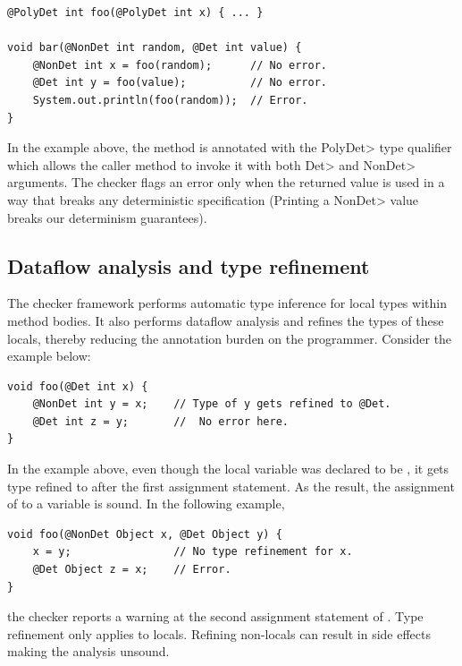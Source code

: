 \begin{verbatim}
@PolyDet int foo(@PolyDet int x) { ... }

void bar(@NonDet int random, @Det int value) {
    @NonDet int x = foo(random);      // No error.
    @Det int y = foo(value);          // No error.
    System.out.println(foo(random));  // Error.
}
\end{verbatim}
In the example above, the method  is annotated with the \<PolyDet> type qualifier which allows
the caller method  to invoke it with both \<Det> and \<NonDet> arguments. The checker flags an error 
only when the returned value is used in a way that breaks any deterministic specification (Printing a \<NonDet> value
breaks our determinism guarantees).

\subsection{Dataflow analysis and type refinement}\label{dataflow}
The checker framework performs automatic type inference for local types within method bodies.
It also performs dataflow analysis and refines the types of these locals, thereby reducing the annotation burden 
on the programmer. Consider the example below:
\begin{verbatim}
void foo(@Det int x) {
    @NonDet int y = x;    // Type of y gets refined to @Det.
    @Det int z = y;       //  No error here.
}
\end{verbatim}
In the example above, even though the local variable  was declared to be , it gets
type refined to  after the first assignment statement. As the result, the assignment of 
to a  variable  is sound. In the following example,
\begin{verbatim}
void foo(@NonDet Object x, @Det Object y) {
    x = y;                // No type refinement for x.
    @Det Object z = x;    // Error.
}
\end{verbatim}
the checker reports a warning at the second assignment statement of . Type refinement only applies to locals. Refining non-locals can result in side effects making the analysis unsound.

